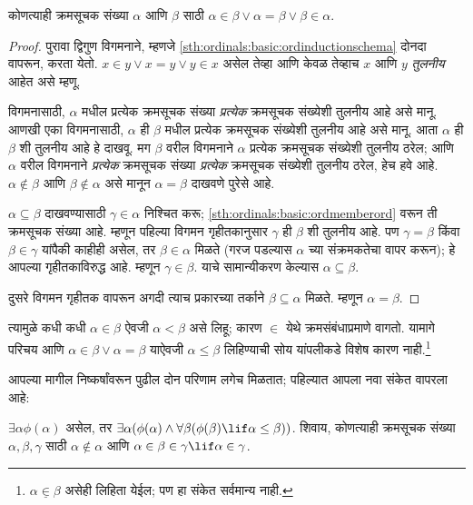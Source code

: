 \begin{thm}[त्रिपर्याय]\label{sth:ordinals:basic:ordtrichotomy}
कोणत्याही क्रमसूचक संख्या $\alpha$ आणि $\beta$ साठी $\alpha \in \beta \lor \alpha = \beta \lor \beta \in \alpha$.
\end{thm}

\begin{proof}
पुरावा द्विगुण विगमनाने, म्हणजे \ref{sth:ordinals:basic:ordinductionschema} दोनदा वापरून, करता येतो. $x \in y \lor x = y \lor y \in x$ असेल तेव्हा आणि केवळ तेव्हाच $x$ आणि $y$ \emph{तुलनीय} आहेत असे म्हणू.

विगमनासाठी, $\alpha$ मधील प्रत्येक क्रमसूचक संख्या \emph{प्रत्येक} क्रमसूचक संख्येशी तुलनीय आहे असे मानू. आणखी एका विगमनासाठी, $\alpha$ ही $\beta$ मधील प्रत्येक क्रमसूचक संख्येशी तुलनीय आहे असे मानू. आता $\alpha$ ही $\beta$ शी तुलनीय आहे हे दाखवू. मग $\beta$ वरील विगमनाने $\alpha$ प्रत्येक क्रमसूचक संख्येशी तुलनीय ठरेल; आणि $\alpha$ वरील विगमनाने \emph{प्रत्येक} क्रमसूचक संख्या \emph{प्रत्येक} क्रमसूचक संख्येशी तुलनीय ठरेल, हेच हवे आहे. $\alpha \notin \beta$ आणि $\beta \notin
\alpha$ असे मानून $\alpha = \beta$ दाखवणे पुरेसे आहे.

$\alpha \subseteq \beta$ दाखवण्यासाठी $\gamma \in \alpha$ निश्चित करू; \ref{sth:ordinals:basic:ordmemberord} वरून ती क्रमसूचक संख्या आहे. म्हणून पहिल्या विगमन गृहीतकानुसार $\gamma$ ही $\beta$ शी तुलनीय आहे. पण $\gamma
= \beta$ किंवा $\beta \in \gamma$ यांपैकी काहीही असेल, तर $\beta \in \alpha$ मिळते (गरज पडल्यास $\alpha$ च्या संक्रमकतेचा वापर करून); हे आपल्या गृहीतकाविरुद्ध आहे. म्हणून $\gamma \in \beta$. याचे सामान्यीकरण केल्यास $\alpha \subseteq
\beta$.

दुसरे विगमन गृहीतक वापरून अगदी त्याच प्रकारच्या तर्काने $\beta \subseteq \alpha$ मिळते. म्हणून $\alpha = \beta$.
\end{proof}\noindent त्यामुळे कधी कधी $\alpha \in \beta$ ऐवजी $\alpha <\beta$ असे लिहू; कारण $\in$ येथे क्रमसंबंधाप्रमाणे वागतो. यामागे परिचय आणि $\alpha \in
\beta \lor \alpha = \beta$ याऐवजी $\alpha \leq \beta$ लिहिण्याची सोय यांपलीकडे विशेष कारण नाही.\footnote{$\alpha
\mathrel{\underline{\in}} \beta$ असेही लिहिता येईल; पण हा संकेत सर्वमान्य नाही.}

आपल्या मागील निष्कर्षांवरून पुढील दोन परिणाम लगेच मिळतात; पहिल्यात आपला नवा संकेत वापरला आहे:

\begin{cor}\label{sth:ordinals:basic:ordordered}
$\exists \alpha\phi(\alpha)$ असेल, तर $\exists \alpha(\phi(\alpha)
\land \forall \beta(\phi(\beta) \lif \alpha \leq \beta))$.
शिवाय, कोणत्याही क्रमसूचक संख्या $\alpha, \beta, \gamma$ साठी $\alpha
\notin \alpha$ आणि $\alpha \in \beta \in \gamma \lif \alpha \in
\gamma$.
\end{cor}

